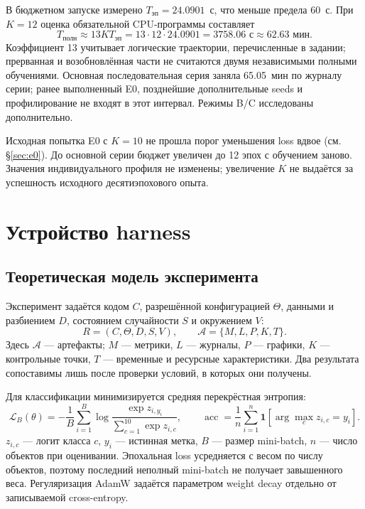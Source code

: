 В бюджетном запуске  измерено $T_{\text{эп}}=24.0901$~с, что меньше предела 60~с. При $K=12$ оценка обязательной CPU-программы составляет
\begin{equation}
T_{\text{полн}}\approx13KT_{\text{эп}}
=13\cdot12\cdot24.0901=3758.06\text{ с}\approx62.63\text{ мин}.
\label{eq:budget}
\end{equation}
Коэффициент 13 учитывает логические траектории, перечисленные в задании; прерванная и возобновлённая части не считаются двумя независимыми полными обучениями. Основная последовательная серия заняла 65.05~мин по журналу серии; ранее выполненный E0, позднейшие дополнительные seeds и профилирование не входят в этот интервал. Режимы B/C исследованы дополнительно.

Исходная попытка E0 с $K=10$ не прошла порог уменьшения loss вдвое (см. §\ref{sec:e0}). До основной серии бюджет увеличен до 12 эпох с обучением заново. Значения индивидуального профиля не изменены; увеличение $K$ не выдаётся за успешность исходного десятиэпохового опыта.

\section{Устройство harness}
\subsection{Теоретическая модель эксперимента}
Эксперимент задаётся кодом $C$, разрешённой конфигурацией $\Theta$, данными и разбиением $D$, состоянием случайности $S$ и окружением $V$:
\begin{equation}
R=(C,\Theta,D,S,V),\qquad
\mathcal A=\{M,L,P,K,T\}.
\label{eq:experiment}
\end{equation}
Здесь $\mathcal A$ --- артефакты; $M$ --- метрики, $L$ --- журналы, $P$ --- графики, $K$ --- контрольные точки, $T$ --- временные и ресурсные характеристики. Два результата сопоставимы лишь после проверки условий, в которых они получены.

Для классификации минимизируется средняя перекрёстная энтропия:
\begin{equation}
\mathcal L_B(\theta)=-\frac{1}{B}\sum_{i=1}^{B}
\log\frac{\exp z_{i,y_i}}{\sum_{c=1}^{10}\exp z_{i,c}},\qquad
\operatorname{acc}=\frac{1}{n}\sum_{i=1}^{n}
\mathbf1\!\left[\arg\max_c z_{i,c}=y_i\right].
\label{eq:loss}
\end{equation}
$z_{i,c}$ --- логит класса $c$, $y_i$ --- истинная метка, $B$ --- размер mini-batch, $n$ --- число объектов при оценивании. Эпохальная loss усредняется с весом по числу объектов, поэтому последний неполный mini-batch не получает завышенного веса. Регуляризация AdamW задаётся параметром weight decay отдельно от записываемой cross-entropy.

